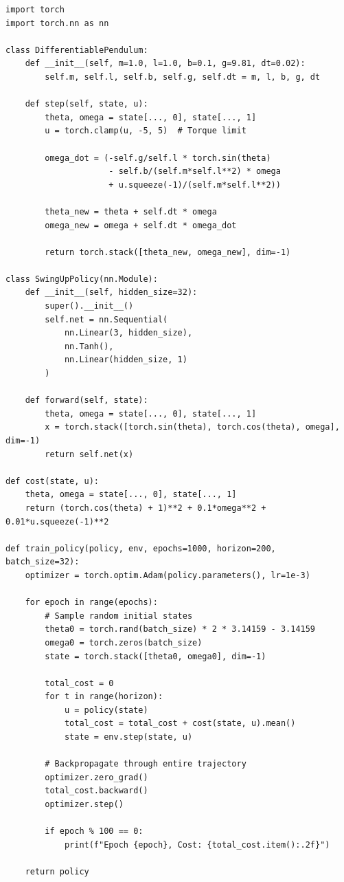 \begin{verbatim}
import torch
import torch.nn as nn

class DifferentiablePendulum:
    def __init__(self, m=1.0, l=1.0, b=0.1, g=9.81, dt=0.02):
        self.m, self.l, self.b, self.g, self.dt = m, l, b, g, dt

    def step(self, state, u):
        theta, omega = state[..., 0], state[..., 1]
        u = torch.clamp(u, -5, 5)  # Torque limit

        omega_dot = (-self.g/self.l * torch.sin(theta)
                     - self.b/(self.m*self.l**2) * omega
                     + u.squeeze(-1)/(self.m*self.l**2))

        theta_new = theta + self.dt * omega
        omega_new = omega + self.dt * omega_dot

        return torch.stack([theta_new, omega_new], dim=-1)

class SwingUpPolicy(nn.Module):
    def __init__(self, hidden_size=32):
        super().__init__()
        self.net = nn.Sequential(
            nn.Linear(3, hidden_size),
            nn.Tanh(),
            nn.Linear(hidden_size, 1)
        )

    def forward(self, state):
        theta, omega = state[..., 0], state[..., 1]
        x = torch.stack([torch.sin(theta), torch.cos(theta), omega], dim=-1)
        return self.net(x)

def cost(state, u):
    theta, omega = state[..., 0], state[..., 1]
    return (torch.cos(theta) + 1)**2 + 0.1*omega**2 + 0.01*u.squeeze(-1)**2

def train_policy(policy, env, epochs=1000, horizon=200, batch_size=32):
    optimizer = torch.optim.Adam(policy.parameters(), lr=1e-3)

    for epoch in range(epochs):
        # Sample random initial states
        theta0 = torch.rand(batch_size) * 2 * 3.14159 - 3.14159
        omega0 = torch.zeros(batch_size)
        state = torch.stack([theta0, omega0], dim=-1)

        total_cost = 0
        for t in range(horizon):
            u = policy(state)
            total_cost = total_cost + cost(state, u).mean()
            state = env.step(state, u)

        # Backpropagate through entire trajectory
        optimizer.zero_grad()
        total_cost.backward()
        optimizer.step()

        if epoch % 100 == 0:
            print(f"Epoch {epoch}, Cost: {total_cost.item():.2f}")

    return policy
\end{verbatim}

